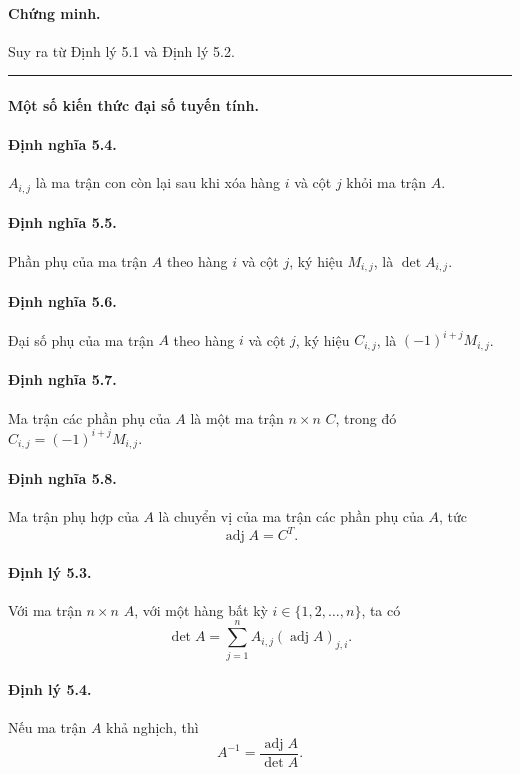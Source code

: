 \documentclass[11pt]{article}
\newcommand{\qedmark}{\hfill\rule{0.7ex}{0.7ex}}
\begin{document}
\paragraph{Chứng minh.}
Suy ra từ Định lý 5.1 và Định lý 5.2. \qedmark

\paragraph{Một số kiến thức đại số tuyến tính.}
\paragraph{Định nghĩa 5.4.}
\(A_{i,j}\) là ma trận con còn lại sau khi xóa hàng \(i\) và cột \(j\) khỏi
ma trận \(A\).

\paragraph{Định nghĩa 5.5.}
Phần phụ của ma trận \(A\) theo hàng \(i\) và cột \(j\), ký hiệu \(M_{i,j}\),
là \(\det A_{i,j}\).

\paragraph{Định nghĩa 5.6.}
Đại số phụ của ma trận \(A\) theo hàng \(i\) và cột \(j\), ký hiệu
\(C_{i,j}\), là \((-1)^{i+j}M_{i,j}\).

\paragraph{Định nghĩa 5.7.}
Ma trận các phần phụ của \(A\) là một ma trận \(n\times n\) \(C\), trong đó
\(C_{i,j}=(-1)^{i+j}M_{i,j}\).

\paragraph{Định nghĩa 5.8.}
Ma trận phụ hợp của \(A\) là chuyển vị của ma trận các phần phụ của \(A\), tức
\[
  \operatorname{adj} A=C^T.
\]

\paragraph{Định lý 5.3.}
Với ma trận \(n\times n\) \(A\), với một hàng bất kỳ
\(i\in\{1,2,\ldots,n\}\), ta có
\[
  \det A=\sum_{j=1}^{n} A_{i,j}(\operatorname{adj} A)_{j,i}.
\]

\paragraph{Định lý 5.4.}
Nếu ma trận \(A\) khả nghịch, thì
\[
  A^{-1}=\frac{\operatorname{adj} A}{\det A}.
\]
\end{document}
